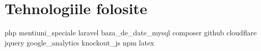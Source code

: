 \chapter{Tehnologiile folosite}
{php}
{mentiuni_speciale}
{laravel}
{baza_de_date_mysql}
{composer}
{github}
{cloudflare}
{jquery}
{google_analytics}
{knockout_js}
{npm}
{latex}
